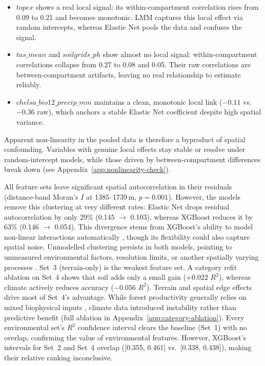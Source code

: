 \documentclass[logo,msc,ai]{infthesis}           %
\begin{document}
\begin{itemize}
    \item $\mathit{topex}$ shows a real local signal: its within-compartment correlation rises from 0.09 to 0.21 and becomes monotonic. LMM captures this local effect via random intercepts, whereas Elastic Net pools the data and confuses the signal.
    \item $\mathit{tas\_mean}$ and $\mathit{soilgrids\_ph}$ show almost no local signal: within-compartment correlations collapse from 0.27 to 0.08 and 0.05. Their raw correlations are between-compartment artifacts, leaving no real relationship to estimate reliably.
    \item $\mathit{chelsa\_bio12\_precip\_mm}$ maintains a clean, monotonic local link ($-0.11$ vs.\ $-0.36$ raw), which anchors a stable Elastic Net coefficient despite high spatial variance.
\end{itemize}

Apparent non-linearity in the pooled data is therefore a byproduct of spatial confounding. Variables with genuine local effects stay stable or resolve under random-intercept models, while those driven by between-compartment differences break down (see Appendix~\ref{app:nonlinearity-check}).

All feature sets leave significant spatial autocorrelation in their residuals (distance-band Moran's $I$ at 1385--1739\,m, $p = 0.001$). However, the models remove this clustering at very different rates: Elastic Net drops residual autocorrelation by only 29\% (0.145 $\to$ 0.103), whereas XGBoost reduces it by 63\% (0.146 $\to$ 0.054). This divergence stems from XGBoost's ability to model non-linear interactions automatically \citep{zou2005Regularization_C4_NN}, though its flexibility could also capture spatial noise. Unmodelled clustering persists in both models, pointing to unmeasured environmental factors, resolution limits, or another spatially varying processes \citep{gaspard2019Residual_C5_EVAL}. Set~3 (terrain-only) is the weakest feature set. A category refit ablation on Set~4 shows that soil adds only a small gain ($+0.022$ $R^2$), whereas climate actively reduces accuracy ($-0.056$ $R^2$). Terrain and spatial edge effects drive most of Set~4's advantage. While forest productivity generally relies on mixed biophysical inputs \citep{bontemps2014Predictive_C2_BG}, climate data introduced instability rather than predictive benefit (full ablation in Appendix~\ref{app:category-ablation}). Every environmental set's $R^2$ confidence interval clears the baseline (Set~1) with no overlap, confirming the value of environmental features. However, XGBoost's intervals for Set~2 and Set~4 overlap ([0.355, 0.461] vs.\ [0.338, 0.438]), making their relative ranking inconclusive.
\end{document}
